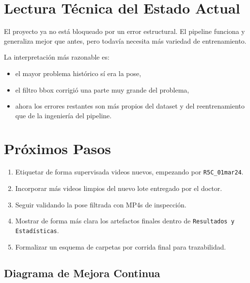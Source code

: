 \documentclass[12pt,a4paper]{article}
\begin{document}
\section{Lectura T\'ecnica del Estado Actual}
El proyecto ya no est\'a bloqueado por un error estructural. El pipeline funciona y generaliza mejor que antes, pero todav\'ia necesita m\'as variedad de entrenamiento.

La interpretaci\'on m\'as razonable es:
\begin{itemize}[leftmargin=1.5cm]
    \item el mayor problema hist\'orico s\'i era la pose,
    \item el filtro bbox corrigi\'o una parte muy grande del problema,
    \item ahora los errores restantes son m\'as propios del dataset y del reentrenamiento que de la ingenier\'ia del pipeline.
\end{itemize}

\section{Pr\'oximos Pasos}
\begin{enumerate}[leftmargin=1.5cm]
    \item Etiquetar de forma supervisada videos nuevos, empezando por \texttt{R5C\_01mar24}.
    \item Incorporar m\'as videos limpios del nuevo lote entregado por el doctor.
    \item Seguir validando la pose filtrada con MP4s de inspecci\'on.
    \item Mostrar de forma m\'as clara los artefactos finales dentro de \texttt{Resultados y Estad\'isticas}.
    \item Formalizar un esquema de carpetas por corrida final para trazabilidad.
\end{enumerate}

\subsection{Diagrama de Mejora Continua}

\begin{center}
\end{center}
\end{document}
